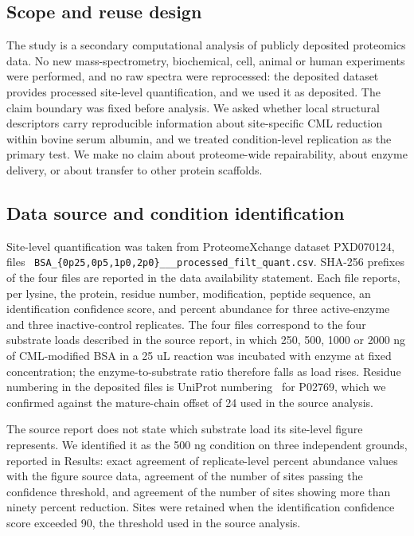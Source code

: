 \documentclass[journal=jprobs,manuscript=article,layout=traditional]{achemso}
\begin{document}
\subsection{Scope and reuse design}

The study is a secondary computational analysis of publicly deposited proteomics data. No new mass-spectrometry, biochemical, cell, animal or human experiments were performed, and no raw spectra were reprocessed: the deposited dataset provides processed site-level quantification, and we used it as deposited. The claim boundary was fixed before analysis. We asked whether local structural descriptors carry reproducible information about site-specific CML reduction within bovine serum albumin, and we treated condition-level replication as the primary test. We make no claim about proteome-wide repairability, about enzyme delivery, or about transfer to other protein scaffolds.

\subsection{Data source and condition identification}

Site-level quantification was taken from ProteomeXchange dataset PXD070124, files ~\cite{perezriverol2025}\texttt{BSA\_\allowbreak \{0p25,0p5,1p0,2p0\}\_\_\_\allowbreak processed\_\allowbreak filt\_\allowbreak quant.csv}. SHA-256 prefixes of the four files are reported in the data availability statement. Each file reports, per lysine, the protein, residue number, modification, peptide sequence, an identification confidence score, and percent abundance for three active-enzyme and three inactive-control replicates. The four files correspond to the four substrate loads described in the source report, in which 250, 500, 1000 or 2000 ng of CML-modified BSA in a 25 uL reaction was incubated with enzyme at fixed concentration; the enzyme-to-substrate ratio therefore falls as load rises. Residue numbering in the deposited files is UniProt numbering~\cite{uniprot2025} for P02769, which we confirmed against the mature-chain offset of 24 used in the source analysis.

The source report does not state which substrate load its site-level figure represents. We identified it as the 500 ng condition on three independent grounds, reported in Results: exact agreement of replicate-level percent abundance values with the figure source data, agreement of the number of sites passing the confidence threshold, and agreement of the number of sites showing more than ninety percent reduction. Sites were retained when the identification confidence score exceeded 90, the threshold used in the source analysis.
\end{document}
